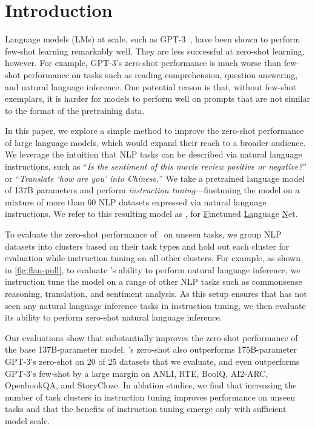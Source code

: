 \clearpage

\section{Introduction}

Language models (LMs) at scale, such as GPT-3~\citep{brown2020language}, have been shown to perform few-shot learning remarkably well. 
They are less successful at zero-shot learning, however.
For example, GPT-3's zero-shot performance is much worse than few-shot performance on tasks such as reading comprehension, question answering, and natural language inference. 
One potential reason is that, without few-shot exemplars, it is harder for models to perform well on prompts that are not similar to the format of the pretraining data.

In this paper, we explore a simple method to improve the zero-shot performance of large language models, which would expand their reach to a broader audience.
We leverage the intuition that NLP tasks can be described via natural language instructions, such as ``\textit{Is the sentiment of this movie review positive or negative?}'' or ``\textit{Translate `how are you' into Chinese.}''
We take a pretrained language model of 137B parameters and perform \textit{instruction tuning}---finetuning the model on a mixture of more than 60 NLP datasets expressed via natural language instructions.
We refer to this resulting model as \flan, for \underline{F}inetuned \underline{La}nguage \underline{N}et.

To evaluate the zero-shot performance of \flan\ on unseen tasks, we group NLP datasets into clusters based on their task types and hold out each cluster for evaluation while instruction tuning \flan{} on all other clusters.
For example, as shown in \cref{fig:flan-pull}, to evaluate \flan's ability to perform natural language inference, we instruction tune the model on a range of other NLP tasks such as commonsense reasoning, translation, and sentiment analysis.
As this setup ensures that \flan{} has not seen any natural language inference tasks in instruction tuning, we then evaluate its ability to perform zero-shot natural language inference.

Our evaluations show that \flan{} substantially improves the zero-shot performance of the base 137B-parameter model.
\flan's zero-shot also outperforms 175B-parameter GPT-3's zero-shot on 20 of 25 datasets that we evaluate, and even outperforms GPT-3's few-shot by a large margin on ANLI, RTE, BoolQ, AI2-ARC, OpenbookQA, and StoryCloze. 
In ablation studies, we find that increasing the number of task clusters in instruction tuning improves performance on unseen tasks and that the benefits of instruction tuning emerge only with sufficient model scale. 

